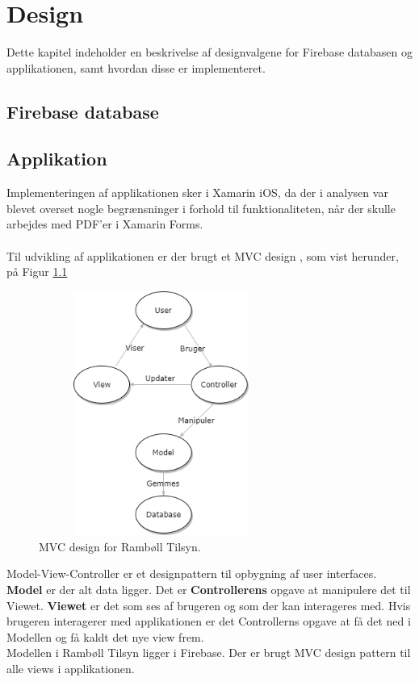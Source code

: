 \chapter{Design}
Dette kapitel indeholder en beskrivelse af designvalgene for Firebase databasen og applikationen, samt hvordan disse er implementeret. \\

\section{Firebase database} \label{sec:FirebaseDesign}

\section{Applikation} \label{sec:ApplikationDesign}
Implementeringen af applikationen sker i Xamarin iOS, da der i analysen var blevet overset nogle begrænsninger i forhold til funktionaliteten, når der skulle arbejdes med PDF'er i Xamarin Forms\cite{Forms}. \\ \\
Til udvikling af applikationen er der brugt et MVC design \cite{MVC}, som vist herunder, på Figur \ref{fig:MVC}
\begin{figure}[H] %
	\centering
	\includegraphics[height=8cm, width=8cm]{../ArkitekturDesign/Design/MVC}
	\caption{MVC design for Rambøll Tilsyn.}
	\label{fig:MVC}
\end{figure}

Model-View-Controller er et designpattern til opbygning af user interfaces. \textbf{Model} er der alt
data ligger. Det er \textbf{Controllerens} opgave at manipulere det til Viewet. \textbf{Viewet} er det som
ses af brugeren og som der kan interageres med. Hvis brugeren interagerer med applikationen er
det Controllerns opgave at få det ned i Modellen og få kaldt det nye view frem. \\
Modellen i Rambøll Tilsyn ligger i Firebase.
Der er brugt MVC design pattern til alle views i applikationen.

\clearpage







